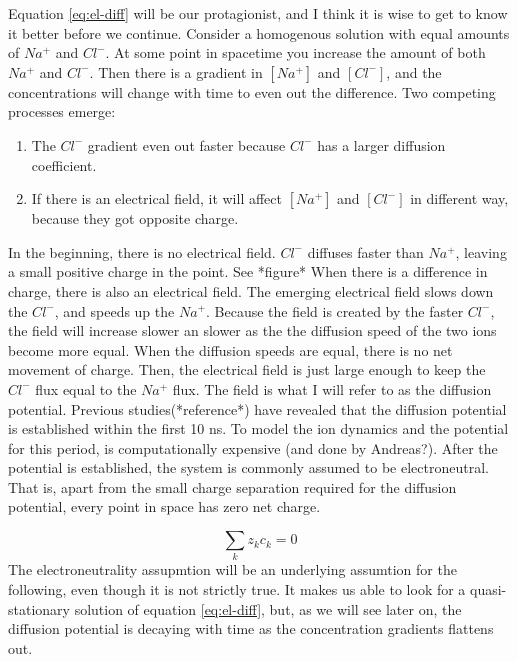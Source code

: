 \documentclass{article}
\begin{document}
Equation \ref{eq:el-diff} will be our protagionist, and I think it is wise to get to know it better before we continue. Consider a homogenous solution with equal amounts of $Na^+$ and $Cl^-$. At some point in spacetime you increase the amount of both $Na^+$ and $Cl^-$. Then there is a gradient in $[Na^+]$ and $[Cl^-]$, and the concentrations will change with time to even out the difference. Two competing processes emerge:
\begin{enumerate}
\item The $Cl^-$ gradient even out faster because $Cl^-$ has a larger diffusion coefficient. 
\item If there is an electrical field, it will affect  $[Na^+]$ and $[Cl^-]$ in different way, because they got opposite charge.
\end{enumerate}

In the beginning, there is no electrical field. $Cl^-$ diffuses faster than $Na^+$, leaving a small positive charge in the point. See *figure* When there is a difference in charge, there is also an electrical field. The emerging electrical field slows down the $Cl^-$, and speeds up the $Na^+$. Because the field is created by the faster $Cl^-$, the field will increase slower an slower as the  the diffusion speed of the two ions become more equal. When the diffusion speeds are equal, there is no net movement of charge. Then, the electrical field is just large enough to keep the $Cl^-$ flux equal to the $Na^+$ flux. The field is what I will refer to as the diffusion potential. Previous studies(*reference*) have revealed that the diffusion potential is established within the first 10 ns. To model the ion dynamics and the potential for this period, is computationally expensive (and done by Andreas?). After the potential is established, the system is commonly assumed to be electroneutral. That is, apart from the small charge separation required for the diffusion potential, every point in space has zero net charge. 

$$\sum _k z_k c_k =0$$
The electroneutrality assupmtion will be an underlying assumtion for the following, even though it is not strictly true. It makes us able to look for a quasi-stationary solution of equation \ref{eq:el-diff}, but, as we will see later on, the diffusion potential is decaying with time as the concentration gradients flattens out. 
\end{document}

